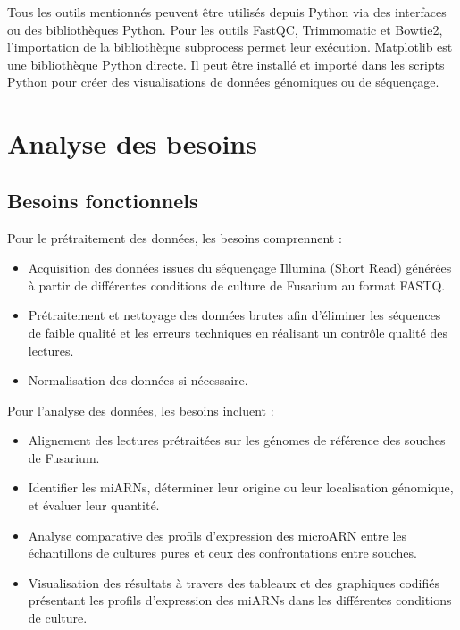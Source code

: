 \documentclass{report}
\begin{document}
Tous les outils mentionnés peuvent être utilisés depuis Python via des interfaces ou des bibliothèques Python. Pour les outils FastQC, Trimmomatic et Bowtie2, l'importation de la bibliothèque subprocess permet leur exécution. Matplotlib est une bibliothèque Python directe. Il peut être installé et importé dans les scripts Python pour créer des visualisations de données génomiques ou de séquençage.


\section{Analyse des besoins}

\subsection{Besoins fonctionnels}
Pour le prétraitement des données, les besoins comprennent :
\begin{itemize}
    \item Acquisition des données issues du séquençage Illumina (Short Read) générées à partir de différentes conditions de culture de Fusarium au format FASTQ.
    \item Prétraitement et nettoyage des données brutes afin d'éliminer les séquences de faible qualité et les erreurs techniques en réalisant un contrôle qualité des lectures.
    \item Normalisation des données si nécessaire.
\end{itemize}
Pour l'analyse des données, les besoins incluent :  
\begin{itemize}
 \item Alignement des lectures prétraitées sur les génomes de référence des souches de Fusarium.
    \item Identifier les miARNs, déterminer leur origine ou leur localisation génomique, et évaluer leur quantité.
    \item Analyse comparative des profils d'expression des microARN entre les échantillons de cultures pures et ceux des confrontations entre souches.
    \item Visualisation des résultats à travers des tableaux et des graphiques codifiés présentant les profils d'expression des miARNs dans les différentes conditions de culture.
\end{itemize}
\end{document}
